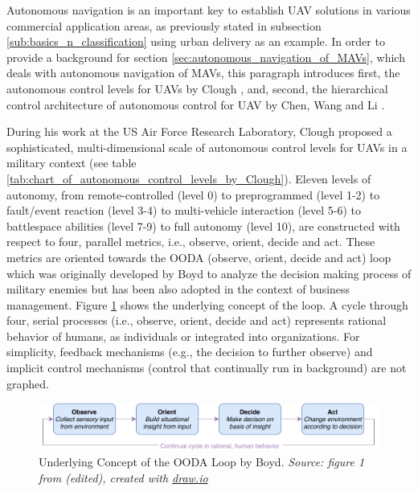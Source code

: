 Autonomous navigation is an important key to establish UAV solutions in various commercial application areas, 
as previously stated in subsection \ref{sub:basics_n_classification} using urban delivery as an example.
In order to provide a background for section \ref{sec:autonomous_navigation_of_MAVs},
which deals with autonomous navigation of MAVs,
this paragraph introduces first, the autonomous control levels for UAVs by Clough \cite{Clough2002},
and, second, the hierarchical control architecture of autonomous control for UAV by Chen, Wang and Li \cite{Chen2009}.



During his work at the US Air Force Research Laboratory, Clough \cite{Clough2002} 
proposed a sophisticated, multi-dimensional scale of autonomous control levels for UAVs in a military context (see table \ref{tab:chart_of_autonomous_control_levels_by_Clough}).
Eleven levels of autonomy, from remote-controlled (level 0) to preprogrammed (level 1-2) to fault/event reaction (level 3-4) to multi-vehicle interaction (level 5-6) to battlespace abilities (level 7-9) to full autonomy (level 10), 
are constructed with respect to four, parallel metrics, i.e., observe, orient, decide and act. 
These metrics are oriented towards the OODA (observe, orient, decide and act) loop
which was originally developed by Boyd to analyze the decision making process of military enemies but has been also adopted in the context of business management. \cite{Angerman2014}
Figure \ref{fig:underlying_concept_of_the_OODA_loop_by_Boyd} shows the underlying concept of the loop. 
A cycle through four, serial processes (i.e., observe, orient, decide and act) represents rational behavior of humans, as individuals or integrated into organizations. 
For simplicity, feedback mechanisms (e.g., the decision to further observe) and implicit control mechanisms
(control that continually run in background) are not graphed.
\begin{figure}
    \centering
    \includegraphics[width=\textwidth]{Figures/draw.io/underlying_concept_of_the_OODA_loop_by_Boyd}
    \decoRule
    \caption[Underlying Concept of the OODA Loop by Boyd]{Underlying Concept of the OODA Loop by Boyd.
    \textit{Source: figure 1 from \cite{Angerman2014} (edited), created with \href{https://www.draw.io/}{draw.io}}} 
    \label{fig:underlying_concept_of_the_OODA_loop_by_Boyd}
\end{figure}




